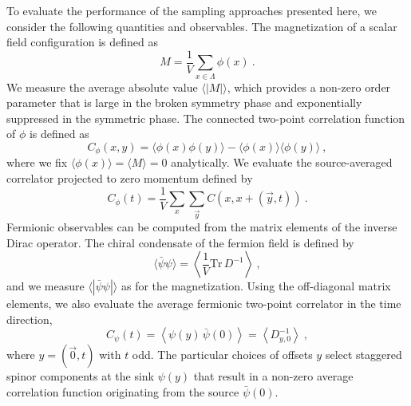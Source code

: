 \documentclass[aps,prd,twocolumn,nofootinbib,superscriptaddress,preprintnumbers]{revtex4-1}
\begin{document}
To evaluate the performance of the sampling approaches presented here, we consider the following quantities and observables. The magnetization of a scalar field configuration is defined as
%
\begin{equation}
    M = \frac{1}{V} \sum_{x \in \Lambda} \phi(x)\ .
\end{equation}
%
We measure the average absolute value $\langle|M|\rangle$, which provides a non-zero order parameter that is large in the broken symmetry phase and exponentially suppressed in the symmetric phase. The connected two-point correlation function of $\phi$ is defined as
%
\begin{equation}
    C_\phi(x,y) = \langle \phi(x) \phi(y) \rangle - \langle \phi(x) \rangle \langle \phi(y) \rangle \ ,
\end{equation}
%
where we fix $\langle \phi(x) \rangle = \langle M \rangle = 0$ analytically. We evaluate the source-averaged correlator projected to zero momentum defined by
%
\begin{equation}
    C_\phi(t) = \frac{1}{V} \sum_{x} \sum_{\vec{y}} C(x, x+(\vec{y},t))\ .
\end{equation}
%
Fermionic observables can be computed from the matrix elements of the inverse Dirac operator. The chiral condensate of the fermion field is defined by
%
\begin{equation}
    \langle \bar\psi\psi \rangle = \left\langle \frac{1}{V} \mathrm{Tr}\, D^{-1} \right\rangle \ ,
\end{equation}
%
and we measure $\langle|\bar\psi\psi|\rangle$ as for the magnetization. Using the off-diagonal matrix elements, we also evaluate the average fermionic two-point correlator in the time direction,
%
\begin{equation}
    C_\psi(t) = \left< \psi(y) \,  \bar{\psi}(0) \right> = \left< D^{-1}_{y,0} \right> \ ,
\end{equation}
%
where $y = (\vec{0}, t)$ with $t$ odd. The particular choices of offsets $y$ select staggered spinor components at the sink $\psi(y)$ that result in a non-zero average correlation function originating from the source $\bar{\psi}(0)$.
\end{document}

